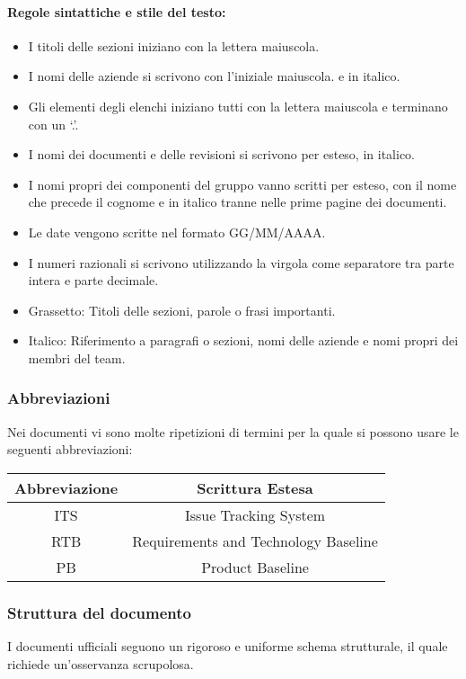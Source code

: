\documentclass{article}
\begin{document}
    \paragraph*{Regole sintattiche e stile del testo:}
    \begin{itemize}
        \item I titoli delle sezioni iniziano con la lettera maiuscola.
        \item I nomi delle aziende si scrivono con l’iniziale maiuscola.
e in italico.
         \item Gli elementi degli elenchi iniziano tutti con la lettera maiuscola e terminano
        con un ‘.’.
        \item I nomi dei documenti e delle revisioni si scrivono per esteso, in italico.
        \item I nomi propri dei componenti del gruppo vanno scritti per esteso, con il nome che
precede il cognome e in italico tranne nelle prime pagine dei documenti.
        \item  Le date vengono scritte nel formato GG/MM/AAAA.
        \item  I numeri razionali si scrivono utilizzando la virgola come separatore tra parte
intera e parte decimale.
\item Grassetto: Titoli delle sezioni, parole o frasi importanti. 
\item Italico: Riferimento a paragrafi o sezioni, nomi delle aziende e nomi propri dei membri del team.
    \end{itemize}
    \subsubsection{Abbreviazioni}
    Nei documenti vi sono molte ripetizioni di termini per la quale si possono usare le seguenti abbreviazioni:\\
    \vspace{0.2cm}
    \begin{tabular}{|c|c|}
  \hline
  \textbf{Abbreviazione} & \textbf{Scrittura Estesa} \\
  \hline
  ITS & Issue Tracking System \\
  RTB & Requirements and Technology Baseline  \\
  PB & Product Baseline\\
  \hline
\end{tabular}

\subsubsection{Struttura del documento}
I documenti ufficiali seguono un rigoroso e uniforme schema strutturale, il quale richiede un'osservanza scrupolosa.
\end{document}
